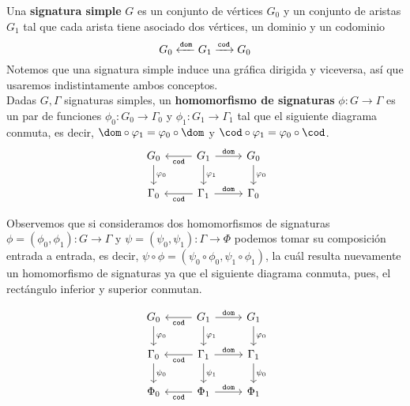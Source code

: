 \documentclass[../main.tex]{subfiles}
\begin{document}
\begin{dfn}
	Una \textbf{signatura simple} \(G\) es un conjunto de vértices \(G_0\) y un conjunto de aristas \(G_1\) tal que cada arista tiene asociado dos vértices, un dominio y un codominio
	$$G_0 \xleftarrow{\tt{dom}} G_1 \xrightarrow{\tt{cod}} G_0$$
    Notemos que una signatura simple induce una gráfica dirigida y viceversa, así que usaremos indistintamente ambos conceptos. \\
	Dadas \( G, \Gamma\) signaturas simples, un \textbf{homomorfismo de signaturas} \( \phi:G \to \Gamma\) es un par de funciones \( \phi_0: G_0 \to \Gamma_0\) y \( \phi_1: G_1 \to \Gamma_1\) tal que el siguiente diagrama conmuta, es decir, $\dom \circ \varphi_1 = \varphi_0 \circ \dom$ y $\cod \circ \varphi_1 = \varphi_0 \circ \cod$.  
	\[
	\begin{tikzcd}
		G_0 \arrow{d}{\phi_0} & G_1 \arrow{r}{\tt{dom}} \arrow{l}{\tt{cod}} \arrow{d}{\phi_1} & G_0 \arrow{d}{\phi_0} \\
		\Gamma_0 & \Gamma_1 \arrow{r}{\tt{dom}} \arrow{l}{\tt{cod}} & \Gamma_0
	\end{tikzcd}
	\]
\end{dfn}
\noindent Observemos que si consideramos dos homomorfismos de signaturas $\phi=(\phi_0, \phi_1): G \to \Gamma$ y $\psi =(\psi _0, \psi_1): \Gamma \to \Phi$ 
podemos tomar su composición entrada a entrada, es decir, $\psi \circ \phi = (\psi_0 \circ \phi_0,\psi_1 \circ \phi_1)$, la  cuál resulta nuevamente un homomorfismo de signaturas ya que el siguiente diagrama conmuta, pues, el rectángulo inferior y superior conmutan.

\[
\begin{tikzcd}
	G_0 \arrow{d}{\phi_0} & G_1 \arrow{r}{\tt{dom}} \arrow{l}{\tt{cod}} \arrow{d}{\phi_1} & G_1 \arrow{d}{\phi_0} \\
	\Gamma_0 \arrow{d}{\psi_0} & \Gamma_1 \arrow{r}{\tt{dom}} \arrow{l}{\tt{cod}} \arrow{d}{\psi_1} & \Gamma_1 \arrow{d}{\psi_0} \\
	\Phi_0 & \Phi_1 \arrow{r}{\tt{dom}} \arrow{l}{\tt{cod}} & \Phi_1 \\
\end{tikzcd} 
\]
\end{document}
